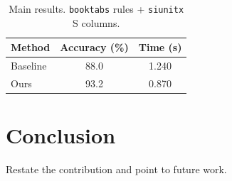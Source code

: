 \documentclass[11pt,a4paper]{article}
\begin{document}
\begin{table}[ht]
  \centering
  \caption{Main results. \texttt{booktabs} rules + \texttt{siunitx} S columns.}
  \label{tab:results}
  \begin{tabular}{l S[table-format=2.1] S[table-format=1.3]}
    \toprule
    Method   & {Accuracy (\%)} & {Time (\si{\second})} \\
    \midrule
    Baseline & 88.0 & 1.240 \\
    Ours     & 93.2 & 0.870 \\
    \bottomrule
  \end{tabular}
\end{table}

\section{Conclusion}
\label{sec:conclusion}
Restate the contribution and point to future work.


\end{document}
